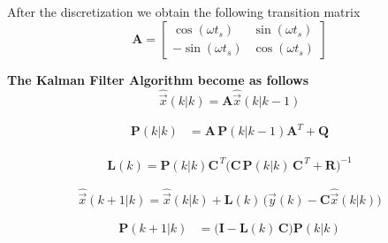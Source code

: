 \documentclass[11pt,a4paper,oneside]{book}
\numberwithin{equation}{section}
\theoremstyle{it}
\theoremstyle{definition}
\begin{document}
After the discretization we obtain the following transition matrix
\begin{equation}
	\mathbf{A} = \begin{bmatrix}
		\cos(\omega t_s) & \sin(\omega t_s) \\ -\sin(\omega t_s) & \cos(\omega 
		t_s)
	\end{bmatrix}
\end{equation}
\begin{mybox}
	\noindent\textbf{The Kalman Filter Algorithm become as follows}
	\begin{equation}\label{ks1b}
		\hat{\vec{x}}\left(k|k\right) = \mathbf{A} 
		\hat{\vec{x}}\left(k|k-1\right)
	\end{equation}
	
	\begin{equation}\label{ks2b}
		\begin{aligned}
			\mathbf{P}\left(k|k\right) &= 
			\mathbf{A}\,\mathbf{P}\left(k|k-1\right) \mathbf{A}^T + \mathbf{Q} 
		\end{aligned}
	\end{equation}
	
	\begin{equation}\label{ks3b}
		\begin{aligned}
			\mathbf{L}(k) = 
			\mathbf{P}(k|k)\mathbf{C}^{\,T}\Big(\mathbf{C}\,\mathbf{P}(k|k)\,\mathbf{C}^{\,T}+\mathbf{R}\Big)^{-1}
		\end{aligned}
	\end{equation}
	
	\begin{equation}\label{ks4b}
		\hat{\vec{x}}\left(k+1|k\right) = \hat{\vec{x}}\left(k|k\right) + 
		\mathbf{L}(k)\, \Big(\vec{y}(k) - 
		\mathbf{C}\hat{\vec{x}}\left(k|k\right)\Big)
	\end{equation}
	
	\begin{equation}\label{ks5b}
		\begin{aligned}
			\mathbf{P}\left(k+1|k\right) &= 
			\Big(\mathbf{I}-\mathbf{L}(k)\,\mathbf{C} \Big) 
			\mathbf{P}\left(k|k\right) 
		\end{aligned}
	\end{equation}
\end{mybox}
\end{document}
